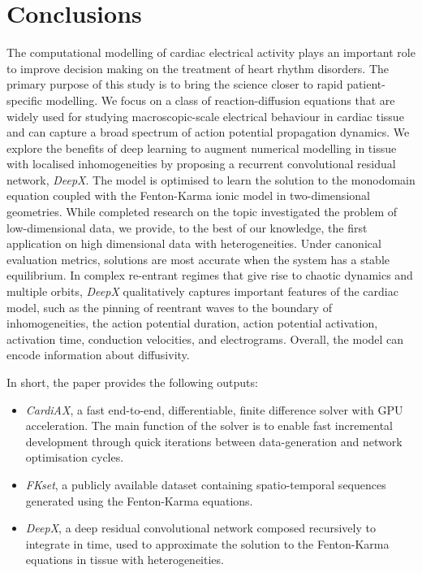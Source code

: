 \documentclass[utf8]{frontiersSCNS} %
\begin{document}
\section{Conclusions}
\label{sec:conclusions}
The computational modelling of cardiac electrical activity plays an important role
to improve decision making on the treatment of heart rhythm disorders.
The primary purpose of this study is to bring the science closer to rapid patient-specific modelling.
We focus on a class of reaction-diffusion equations that are widely used for studying macroscopic-scale electrical behaviour in cardiac tissue and can capture a broad spectrum of action potential propagation dynamics.
We explore the benefits of deep learning to augment numerical modelling in tissue with localised inhomogeneities by proposing a recurrent convolutional residual network, \textit{DeepX}. The model is optimised to learn the solution to the monodomain equation coupled with the Fenton-Karma \cite[]{Fenton1998} ionic model in two-dimensional geometries.
While completed research on the topic investigated the problem of low-dimensional data, we provide, to the best of our knowledge, the first application on high dimensional data with heterogeneities.
Under canonical evaluation metrics, solutions are most accurate when the system has a stable equilibrium. In complex re-entrant regimes that give rise to chaotic dynamics and multiple orbits, \textit{DeepX} qualitatively captures important features of the cardiac model, such as the pinning of reentrant waves to the boundary of inhomogeneities, the action potential duration, action potential activation, activation time, conduction velocities, and electrograms. Overall, the model can encode information about diffusivity.

In short, the paper provides the following outputs:
\begin{itemize}
\item \textit{CardiAX}, a fast end-to-end, differentiable, finite difference solver with GPU acceleration.
The main function of the solver is to enable fast incremental development through quick iterations between data-generation and network optimisation cycles.
\item \textit{FKset}, a publicly available dataset containing spatio-temporal sequences generated using the Fenton-Karma equations.
\item \textit{DeepX}, a deep residual convolutional network composed recursively to integrate in time, used to approximate the solution to the Fenton-Karma equations in tissue with heterogeneities.
\end{itemize}
\end{document}
